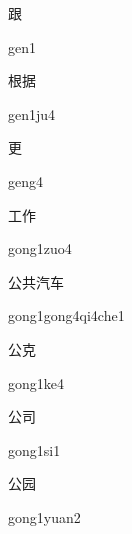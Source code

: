 \begin{verbete}[gen1]{跟}
\begin{pronuncia}{gen1}
\end{pronuncia}
\end{verbete}

\begin{verbete}[gen1ju4]{根据}
\begin{pronuncia}{gen1ju4}
\end{pronuncia}
\end{verbete}

\begin{verbete}[geng4]{更}
\begin{pronuncia}{geng4}
\end{pronuncia}
\end{verbete}

\begin{verbete}{工作}
\begin{pronuncia}{gong1zuo4}
\end{pronuncia}
\end{verbete}

\begin{verbete}{公共汽车}
\begin{pronuncia}{gong1gong4qi4che1}
\end{pronuncia}
\end{verbete}

\begin{verbete}[gong1ke4]{公克}
\begin{pronuncia}{gong1ke4}
\end{pronuncia}
\end{verbete}

\begin{verbete}[gong1si1]{公司}
\begin{pronuncia}{gong1si1}
\end{pronuncia}
\end{verbete}

\begin{verbete}{公园}
\begin{pronuncia}{gong1yuan2}
\end{pronuncia}
\end{verbete}

